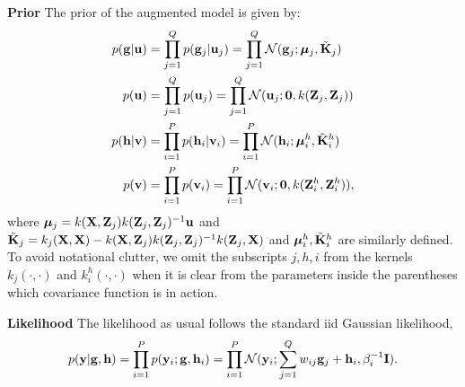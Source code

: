 \noindent
\textbf{Prior}
The prior of the augmented model is given by:
\begin{align}
p(\mathbf{g} | \mathbf{u}) &= \prod_{j=1}^Q p(\mathbf{g}_j | \mathbf{u}_j) = \prod_{j=1}^Q \mathcal{N}(\mathbf{g}_j; \boldsymbol{\mu}_j, \tilde{\mathbf{K}}_j )\\
p(\mathbf{u}) &= \prod_{j=1}^Q p(\mathbf{u}_j) = \prod_{j=1}^Q \mathcal{N}(\mathbf{u}_j; \mathbf{0}, k(\mathbf{Z}_j, \mathbf{Z}_j)) \\
p(\mathbf{h} | \mathbf{v}) &= \prod_{i=1}^P p(\mathbf{h}_i | \mathbf{v}_i) = \prod_{i=1}^P \mathcal{N}(\mathbf{h}_i; \boldsymbol{\mu}^h_i, \tilde{\mathbf{K}}^h_i)\\
p(\mathbf{v}) &= \prod_{i=1}^P p(\mathbf{v}_i) = \prod_{i=1}^P \mathcal{N}(\mathbf{v}_i; \mathbf{0}, k(\mathbf{Z}^h_i, \mathbf{Z}^h_i)),
\end{align}
where $\boldsymbol{\mu}_j = k(\mathbf{X},\mathbf{Z}_j)k(\mathbf{Z}_j,\mathbf{Z}_j)^{-1}\mathbf{u}$ and $\tilde{\mathbf{K}}_j = k_j(\mathbf{X},\mathbf{X}) - k(\mathbf{X},\mathbf{Z}_j)k(\mathbf{Z}_j,\mathbf{Z}_j)^{-1}k(\mathbf{Z}_j,\mathbf{X})$ and $\boldsymbol{\mu}^h_i, \tilde{\mathbf{K}}^h_i$ are similarly defined.
To avoid notational clutter, we omit the subscripts $j,h,i$ from the kernels $k_j(\cdot,\cdot)$ and $k^h_i(\cdot,\cdot)$ when it is clear from the parameters inside the parentheses which covariance function is in action. 

\noindent
\textbf{Likelihood}
The likelihood as usual follows the standard iid Gaussian likelihood,
\begin{align}
p(\mathbf{y} | \mathbf{g}, \mathbf{h} ) = \prod_{i=1}^P p( \mathbf{y}_i ; \mathbf{g}, \mathbf{h}_i) = \prod_{i=1}^P \mathcal{N}( \mathbf{y}_i ; \sum_{j=1}^Q w_{ij} \mathbf{g}_j + \mathbf{h}_i, \beta_i^{-1} \mathbf{I}).
\end{align}

